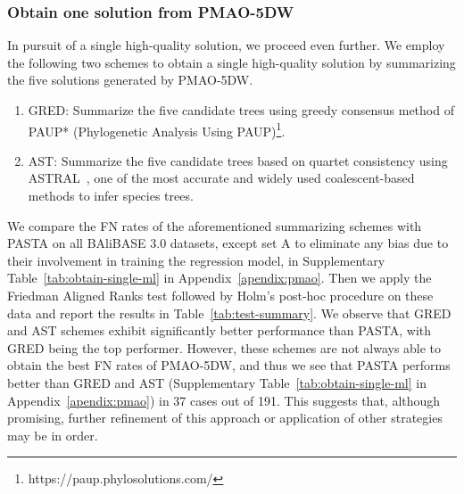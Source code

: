 \subsubsection{Obtain one solution from PMAO-5DW}
In pursuit of a single high-quality solution, we proceed even further. We employ the following two schemes to obtain a single high-quality solution by summarizing the five solutions generated by PMAO-5DW.
\begin{enumerate}
\item GRED: Summarize the five candidate trees using greedy consensus method of PAUP* (Phylogenetic Analysis Using PAUP)\footnote{https://paup.phylosolutions.com/}.
	\item AST: Summarize the five candidate trees based on quartet consistency using ASTRAL~\cite{zhang2018astral}, one of the most accurate and widely used coalescent-based methods to infer species trees.
\end{enumerate}
We compare the FN rates of the aforementioned summarizing schemes with PASTA on all BAliBASE 3.0 datasets, except set A to eliminate any bias due to their involvement in training the regression model, in Supplementary Table~\ref{tab:obtain-single-ml} in Appendix~\ref{apendix:pmao}. Then we apply the Friedman Aligned Ranks test followed by Holm's post-hoc procedure on these data and report the results in Table~\ref{tab:test-summary}. We observe that GRED and AST schemes exhibit significantly better performance than PASTA, with GRED being the top performer. However, these schemes are not always able to obtain the best FN rates of PMAO-5DW, and thus we see that PASTA performs better than GRED and AST (Supplementary Table~\ref{tab:obtain-single-ml} in Appendix~\ref{apendix:pmao}) in 37 cases out of 191. This suggests that, although promising, further refinement of this approach or application of other strategies may be in order.

